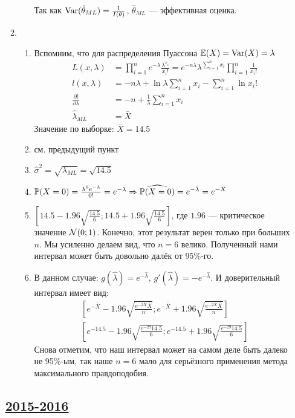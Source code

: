 \begin{enumerate}[resume]
\begin{enumerate}
\begin{enumerate}
  Так как $\Var(\hat{\theta}_{ML}) = \frac{1}{I(\theta)}$, $\hat{\theta}_{ML}$ — эффективная оценка.
\end{enumerate}
\item
\begin{enumerate}
\item Вспомним, что для распределения Пуассона $\E(X) = \Var(X) = \lambda$
\begin{align*}
  L(x, \lambda) &= \prod_{i=1}^n e^{-\lambda} \frac{\lambda^{x_i}}{x_i!} = e^{-n\lambda} \lambda^{\sum_{i=1}^n x_i} \prod_{i=1}^n \frac{1}{x_i!} \\
  l(x, \lambda) &= -n\lambda + \ln\lambda \sum_{i=1}^n x_i - \sum_{i=1}^n \ln x_i! \\
  \frac{\partial l}{\partial \lambda} &= -n + \frac{1}{\lambda} \sum_{i=1}^n x_i \\
  \hat{\lambda}_{ML} &= \bar{X}
\end{align*}
Значение по выборке: $\bar{X} = 14.5$
\item см. предыдущий пункт
\item $\hat \sigma^2 = \sqrt{\lambda_{ML}} = \sqrt{14.5}$
\item $\P(X=0) = \frac{\lambda^0 e^{-\lambda}}{0!} = e^{-\lambda} \Rightarrow \widehat{\P(X=0)} = e^{-\hat\lambda} = e^{-\bar{X}}$
\item $\left[14.5 - 1.96 \sqrt{\frac{14.5}{6}}; 14.5 + 1.96 \sqrt{\frac{14.5}{6}}\right]$, где $1.96$ — критическое значение $\cN(0;1)$. Конечно, этот результат верен только при больших $n$. Мы усиленно делаем вид, что $n=6$ велико. Полученный нами интервал может быть довольно далёк от 95\%-го.
\item В данном случае: $g(\hat{\lambda}) = e^{-\hat\lambda}$, $g'(\hat\lambda) = -e^{-\hat\lambda}$.
И доверительный интервал имеет вид:
\begin{align*}
  \left[e^{-\bar{X}} - 1.96 \sqrt{\frac{e^{-2\bar{X}}\bar{X}}{n}}; e^{-\bar{X}} + 1.96 \sqrt{\frac{e^{-2\bar{X}}\bar{X}}{n}} \right] \\
  \left[e^{-14.5} - 1.96 \sqrt{\frac{e^{-29}14.5}{6}}; e^{-14.5} + 1.96 \sqrt{\frac{e^{-29}14.5}{6}} \right]
\end{align*}
Снова отметим, что наш интервал может на самом деле быть далеко не 95\%-ым, так наше $n=6$ мало для серьёзного применения метода максимального правдоподобия.
\end{enumerate}
\end{enumerate}



\subsection[2015-2016]{\hyperref[sec:kr_03_2015_2016]{2015-2016}}
\label{sec:sol_kr_03_2015_2016}


\end{enumerate}
